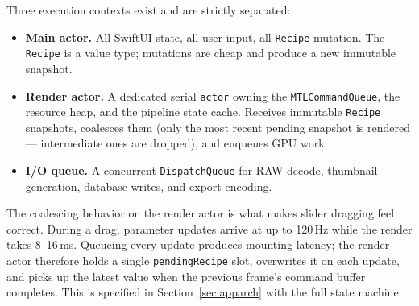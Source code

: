 Three execution contexts exist and are strictly separated:

\begin{itemize}
\item \textbf{Main actor.} All SwiftUI state, all user input, all
\texttt{Recipe} mutation. The \texttt{Recipe} is a value type; mutations are
cheap and produce a new immutable snapshot.
\item \textbf{Render actor.} A dedicated serial \texttt{actor} owning the
\texttt{MTLCommandQueue}, the resource heap, and the pipeline state cache.
Receives immutable \texttt{Recipe} snapshots, coalesces them (only the most
recent pending snapshot is rendered --- intermediate ones are dropped), and
enqueues GPU work.
\item \textbf{I/O queue.} A concurrent \texttt{DispatchQueue} for RAW decode,
thumbnail generation, database writes, and export encoding.
\end{itemize}

The coalescing behavior on the render actor is what makes slider dragging feel
correct. During a drag, parameter updates arrive at up to 120\,Hz while the
render takes 8--16\,ms. Queueing every update produces mounting latency; the
render actor therefore holds a single \texttt{pendingRecipe} slot, overwrites
it on each update, and picks up the latest value when the previous frame's
command buffer completes. This is specified in Section~\ref{sec:apparch} with
the full state machine.
